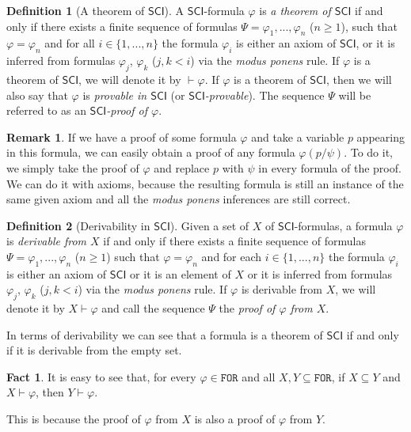 \documentclass{article}
\theoremstyle{definition}
\newtheorem{definition}{Definition}[section]
\theoremstyle{definition}
\theoremstyle{definition}
\newtheorem{remark}{Remark}[section]
\theoremstyle{definition}
\newtheorem{fact}{Fact}[section]
\theoremstyle{definition}
\newcommand*{\FOR}{\texttt{FOR}}
\newcommand{\SCI}{$\mathsf{SCI}$\xspace}
\begin{document}
\begin{definition}[A theorem of \SCI]
    A \SCI-formula $\varphi$ is \emph{a theorem of \SCI} if and only if there exists a finite sequence of formulas $\Psi = \varphi_1, ..., \varphi_n$ ($n \geq 1$), such that $\varphi = \varphi_n$ and for all $i \in \{1, ..., n\}$ the formula $\varphi_i$ is either an axiom of \SCI, or it is inferred from formulas $\varphi_j$, $\varphi_k$ ($j, k <i$) via the \emph{modus ponens} rule. If $\varphi$ is a theorem of \SCI, we will denote it by $\vdash \varphi$. If $\varphi$ is a theorem of \SCI, then we will also say that $\varphi$ is \emph{provable in \SCI} (or \emph{\SCI-provable}). The sequence $\Psi$ will be referred to as an \emph{\SCI-proof of $\varphi$}.
    \label{theorem}
\end{definition}
%
\begin{remark}
    \label{remark_proof_varphi}
    If we have a proof of some formula $\varphi$ and take a variable $p$ appearing in this formula, we can easily obtain a proof of any formula $\varphi(p/\psi)$. To do it, we simply take the proof of $\varphi$ and replace $p$ with $\psi$ in every formula of the proof. We can do it with axioms, because the resulting formula is still an instance of the same given axiom and all the \emph{modus ponens} inferences are still correct.
\end{remark}
%
\begin{definition}[Derivability in \SCI]
    Given a set of $X$ of \SCI-formulas, a formula $\varphi$ is \emph{derivable from $X$} if and only if there exists a finite sequence of formulas $\Psi = \varphi_1, ..., \varphi_n$ ($n \geq 1$) such that $\varphi = \varphi_n$ and for each $i \in \{1, ..., n\}$ the formula $\varphi_i$ is either an axiom of \SCI or it is an element of $X$ or it is inferred from formulas $\varphi_j$, $\varphi_k$ ($j, k <i$) via the \emph{modus ponens} rule. If $\varphi$ is derivable from $X$, we will denote it by $X \vdash \varphi$ and call the sequence $\Psi$ the \emph{proof of $\varphi$ from $X$}.
\end{definition}
%
In terms of derivability we can see that a formula is a theorem of \SCI if and
only if it is derivable from the empty set.

\begin{fact} It is easy to see that, for every $\varphi \in \FOR$ and all $X, Y \subseteq \FOR$, if $X \subseteq Y$ and $X \vdash \varphi$, then $Y \vdash \varphi$.
\end{fact}
%
This is because the proof of $\varphi$ from $X$ is also a proof of $\varphi$
from $Y$.
\end{document}
